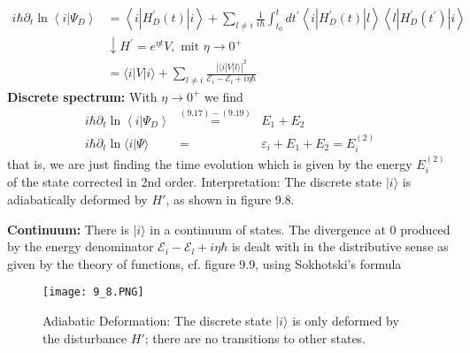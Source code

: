 \begin{equation}
\begin{aligned} i \hbar \partial_{t} \ln \left\langle i | \Psi_{D}\right\rangle &=\left\langle i\left|H_{D}^{\prime}(t)\right| i\right\rangle+\sum_{l \neq i} \frac{1}{i \hbar} \int_{t_{0}}^{t} d t^{\prime}\left\langle i\left|H_{D}^{\prime}(t)\right| l\right\rangle\left\langle l\left|H_{D}^{\prime}\left(t^{\prime}\right)\right| i\right\rangle \\ & \downarrow H^{\prime}=e^{\eta t} V, \text { mit } \eta \rightarrow 0^{+} \\ &=\langle i|V| i\rangle+\sum_{l \neq i} \frac{|\langle i|V| l\rangle|^{2}}{\mathcal{E}_{i}-\mathcal{E}_{l}+i \eta \hbar} \end{aligned}
\end{equation}
\textbf{Discrete spectrum:} With $\eta\rightarrow 0^+$ we find
\begin{equation}
\begin{array}{rcl} i \hbar \partial_{t} \ln \left\langle i | \Psi_{D}\right\rangle &\stackrel{(9.17)-(9.19)}{=}& E_{1}+E_{2} \\ i \hbar \partial_{t} \ln \langle i | \Psi\rangle &=&\varepsilon_{i}+E_{1}+E_{2}=E_{i}^{(2)} \end{array}
\end{equation}
that is, we are just finding the time evolution which is given by the energy $E^{(2)}_i$ of the state corrected in 2nd order. Interpretation: The discrete state $| i\rangle$ is adiabatically deformed by $H'$, as shown in figure 9.8.

\textbf{Continuum:} There is $| i\rangle$ in a continuum of states. The divergence at 0 produced by the energy denominator $\mathcal{E}_i-\mathcal{E}_l+i\eta\hbar$ is dealt with in the distributive sense as given by the theory of functions, cf. figure 9.9, using Sokhotski's formula
\begin{figure}[ht]
    \begin{minipage}{0.6\textwidth}
        \centering
        \texttt{[image: 9\_8.PNG]}
    \end{minipage}
    \begin{minipage}{0.4\textwidth}
        \caption{Adiabatic Deformation: The discrete state $| i\rangle$ is only deformed by the disturbance $H'$; there are no transitions to other states.}
    \end{minipage}
\end{figure}

